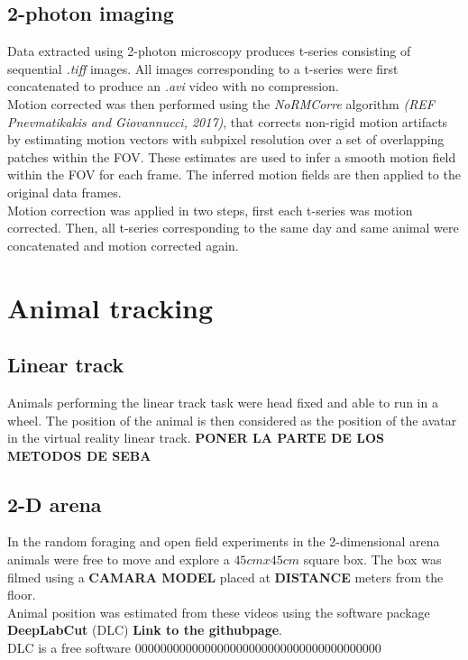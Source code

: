 \subsection{2-photon imaging}
\label{chap3:sec:2:subsec2:2p-pre-proc}
Data extracted using 2-photon microscopy produces t-series consisting of sequential \textit{.tiff} images. 
All images corresponding to a t-series were first concatenated to produce an \textit{.avi} video with no compression. \\
Motion corrected was then performed using the \textit{NoRMCorre} algorithm \textit{(REF Pnevmatikakis and Giovannucci, 2017)}, that corrects non-rigid motion artifacts by estimating motion vectors with subpixel resolution over a set of overlapping patches within the FOV. 
These estimates are used to infer a smooth motion field within the FOV for each frame. 
The inferred motion fields are then applied to the original data frames.\\
Motion correction was applied in two steps, first each t-series was motion corrected.
Then, all t-series corresponding to the same day and same animal were concatenated and motion corrected again. 

\section{Animal tracking}
\label{chap3:sec:3:tracking}
\subsection{Linear track}
\label{chap3:sec:3:subsec1:linear-track-tracking}
Animals performing the linear track task were head fixed and able to run in a wheel.
The position of the animal is then considered as the position of the avatar in the virtual reality linear track. \textbf{PONER LA PARTE DE LOS METODOS DE SEBA}
\subsection{2-D arena}
\label{chap3:sec:3:subsec2:2d-arena-tracking}
In the random foraging and open field experiments in the 2-dimensional arena animals were free to move and explore a $45 cm x 45 cm$ square box. The box was filmed using a \textbf{CAMARA MODEL} placed at \textbf{DISTANCE} meters from the floor. \\
Animal position was estimated from these videos using the software package \textbf{DeepLabCut} (DLC) \textbf{Link to the githubpage}.\\
DLC is a free software 000000000000000000000000000000000000000


